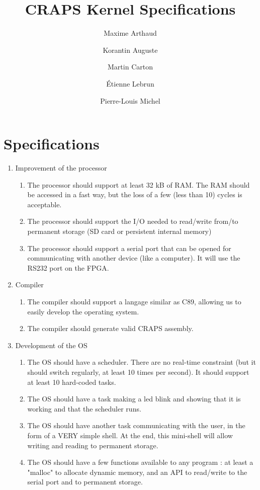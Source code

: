 \documentclass{article}
\title{CRAPS Kernel Specifications}
\author{
       Maxime Arthaud
  \and Korantin Auguste
  \and Martin Carton
  \and Étienne Lebrun
  \and Pierre-Louis Michel
}
\begin{document}
  
  \newpage

  \section{Specifications}

    \begin{enumerate}
    \item Improvement of the processor
        \begin{enumerate}
        \item The processor should support at least 32 kB of RAM. The RAM should be accessed in a fast way, but the loss of a few (less than 10) cycles is acceptable.
        \item The processor should support the I/O needed to read/write from/to permanent storage (SD card or persistent internal memory)
        \item The processor should support a serial port that can be opened for communicating with another device (like a computer). It will use the RS232 port on the FPGA.
        \end{enumerate}
    \item Compiler
        \begin{enumerate}
        \item The compiler should support a langage similar as C89, allowing us to easily develop the operating system.
        \item The compiler should generate valid CRAPS assembly.
        \end{enumerate}
    \item Development of the OS
        \begin{enumerate}
        \item The OS should have a scheduler. There are no real-time constraint (but it should switch regularly, at least 10 times per second). It should support at least 10 hard-coded tasks.
        \item The OS should have a task making a led blink and showing that it is working and that the scheduler runs.
        \item The OS should have another task communicating with the user, in the form of a VERY simple shell. At the end, this mini-shell will allow writing and reading to permanent storage.
        \item The OS should have a few functions available to any program : at least a "malloc" to allocate dynamic memory, and an API to read/write to the serial port and to permanent storage.
        \end{enumerate}
    \end{enumerate}
\end{document}
